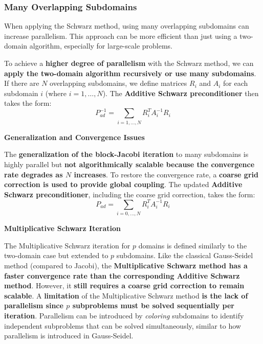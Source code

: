 \subsubsection{Many Overlapping Subdomains}

When applying the Schwarz method, using many overlapping subdomains can increase parallelism. This approach can be more efficient than just using a two-domain algorithm, especially for large-scale problems.

\highspace
To achieve a \textbf{higher degree of parallelism} with the Schwarz method, we can \textbf{apply the two-domain algorithm recursively or use many subdomains}. If there are $N$ overlapping subdomains, we define matrices $R_{i}$ and $A_{i}$ for each subdomain $i$ (where $i = 1, \ldots, N$). The \textbf{Additive Schwarz preconditioner} then takes the form:
\begin{equation}
    P_{ad}^{-1} = \displaystyle\sum_{i=1, \ldots, N} R_{i}^{T} A_{i}^{-1} R_{i}
\end{equation}

\highspace
\begin{flushleft}
    \textcolor{Green3}{ \textbf{Generalization and Convergence Issues}}
\end{flushleft}
The \textbf{generalization of the block-Jacobi iteration} to many subdomains is highly parallel but \textbf{not algorithmically scalable because the convergence rate degrades as $N$ increases}. To restore the convergence rate, a \textbf{coarse grid correction is used to provide global coupling}. The updated \textbf{Additive Schwarz preconditioner}, including the coarse grid correction, takes the form:
\begin{equation}
    P_{ad} = \displaystyle\sum_{i=0, \ldots, N} R_{i}^{T} A_{i}^{-1} R_{i}
\end{equation}

\highspace
\begin{flushleft}
    \textcolor{Green3}{ \textbf{Multiplicative Schwarz Iteration}}
\end{flushleft}
The Multiplicative Schwarz iteration for $p$ domains is defined similarly to the two-domain case but extended to $p$ subdomains. Like the classical Gauss-Seidel method (compared to Jacobi), the \textbf{Multiplicative Schwarz method has a faster convergence rate than the corresponding Additive Schwarz method}. However, it \textbf{still requires a coarse grid correction to remain scalable}. A \textbf{limitation} of the Multiplicative Schwarz method \textbf{is the lack of parallelism since $p$ subproblems must be solved sequentially per iteration}. Parallelism can be introduced by \emph{coloring} subdomains to identify independent subproblems that can be solved simultaneously, similar to how parallelism is introduced in Gauss-Seidel.
